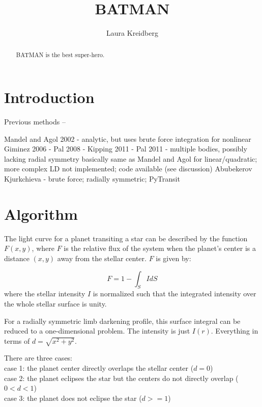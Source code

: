 \documentclass[12pt,preprint]{aastex}
\begin{document}
\title{BATMAN}

\author{Laura Kreidberg}



\begin{abstract}
BATMAN is the best super-hero.
\end{abstract}



\section{Introduction}
Previous methods --

Mandel and Agol 2002 - analytic, but uses brute force integration for nonlinear
Giminez 2006 -
Pal 2008 - 
Kipping 2011 -
Pal 2011 - multiple bodies, possibly lacking radial symmetry
	basically same as Mandel and Agol for linear/quadratic; more complex LD not implemented; code available (see discussion)
Abubekerov 
Kjurkchieva - brute force; radially symmetric; 
PyTransit

\section{Algorithm}
The light curve for a planet transiting a star can be described by the function $F(x,y)$, where $F$ is the relative flux of the system when the planet's center is a distance $(x,y)$ away from the stellar center.  $F$ is given by:

\begin{equation}
F = 1 - \int_S{I dS}
\end{equation}
where the stellar intensity $I$ is normalized such that the integrated intensity over the whole stellar surface is unity. 

For a radially symmetric limb darkening profile, this surface integral can be reduced to a one-dimensional problem. The intensity is just $I(r)$. Everything in terms of $d = \sqrt{x^2+y^2}$. 

There are three cases:\\
case 1: the planet center directly overlaps the stellar center ($d = 0$)\\
case 2: the planet eclipses the star but the centers do not directly overlap ($0<d<1$)\\
case 3: the planet does not eclipse the star ($d>=1$)
\end{document}
